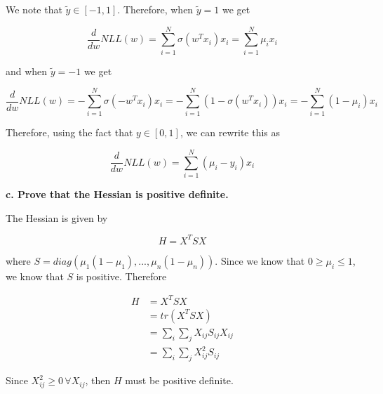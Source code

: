 {We note that $\tilde{y} \in [-1, 1]$. Therefore, when $\tilde{y} = 1$ we get

$$\frac{d}{dw} NLL(w) = \sum_{i=1}^N \sigma(w^Tx_i)x_i = \sum_{i=1}^N \mu_ix_i$$

and when $\tilde{y} = -1$ we get

$$\frac{d}{dw} NLL(w) = -\sum_{i=1}^N \sigma(-w^Tx_i)x_i =
                        -\sum_{i=1}^N (1 - \sigma(w^Tx_i))x_i =
                        -\sum_{i=1}^N (1 - \mu_i)x_i$$

Therefore, using the fact that $y \in [0, 1]$, we can rewrite this as

$$\frac{d}{dw} NLL(w) = \sum_{i=1}^N (\mu_i - y_i)x_i$$

\textbf{c. Prove that the Hessian is positive definite.}

The Hessian is given by

$$H = X^TSX$$

where $S = diag(\mu_1(1-\mu_1), ..., \mu_n(1-\mu_n))$. Since we know that
$0 \geq \mu_i \leq 1$, we know that $S$ is positive. Therefore

\begin{align}
    H & = X^TSX \\
      & = tr(X^TSX) \\
      & = \sum_i \sum_j X_{ij} S_{ij} X_{ij} \\
      & = \sum_i \sum_j X_{ij}^2 S_{ij}
\end{align}

Since $X_{ij}^2 \geq 0 \, \forall X_{ij}$, then $H$ must be positive definite.

}

